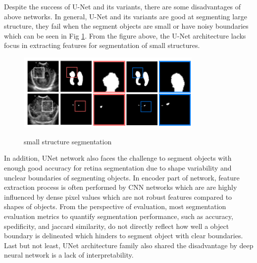 \documentclass[UTF8]{article} %
\begin{document}
Despite the success of U-Net and its variants,  there are some disadvantages of above networks. In general, U-Net and its variants are good at segmenting large structure, they fail when the segment objects are small or have noisy boundaries which can be seen in Fig \ref{fig:segment_small_structures}. From the figure above, the U-Net architecture lacks focus in extracting features for segmentation of small structures. 
\begin{figure}[H]
\small
\centering
\includegraphics[width=0.8\textwidth]{segment_small_structures}
\label{fig:segment_small_structures}
\caption{small structure segmentation}
\end{figure}

In addition, UNet network also faces the challenge to segment objects with enough good accuracy for retina segmentation due to 
shape variability and unclear boundaries of segmenting objects. In encoder part of network, feature extraction process is often performed by CNN networks which are are highly influenced by dense pixel values which are not robust features compared to shapes of objects. From the perspective of evaluation,  most segmentation evaluation metrics to quantify segmentation performance, such as accuracy, spedificity, and jaccard similarity, do not directly reflect how well a object boundary is delineated which hinders to segment object with clear boundaries. Last but not least,  UNet architecture family also shared the disadvantage by deep neural network is a lack of interpretability. 
\end{document}

